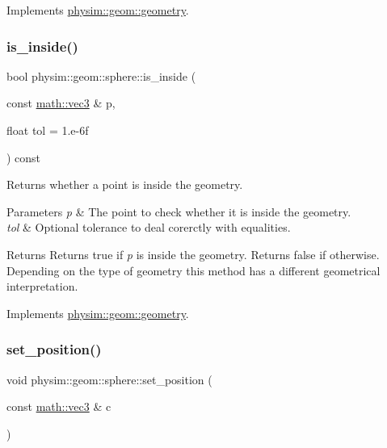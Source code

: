 Implements \hyperlink{classphysim_1_1geom_1_1geometry_a0870a4892819489b7e830663a3f582b8}{physim\+::geom\+::geometry}.

\mbox{\label{classphysim_1_1geom_1_1sphere_a418c319892851c7a29e1a37e07a6811e}} 
\subsubsection{\texorpdfstring{is\+\_\+inside()}{is\_inside()}}
{\footnotesize\ttfamily bool physim\+::geom\+::sphere\+::is\+\_\+inside (\begin{DoxyParamCaption}\item[{const \hyperlink{structphysim_1_1math_1_1vec3}{math\+::vec3} \&}]{p,  }\item[{float}]{tol = {\ttfamily 1.e-\/6f} }\end{DoxyParamCaption}) const\hspace{0.3cm}{\ttfamily [virtual]}}



Returns whether a point is inside the geometry. 


\begin{DoxyParams}{Parameters}
{\em p} & The point to check whether it is inside the geometry. \\
\hline
{\em tol} & Optional tolerance to deal corerctly with equalities. \\
\hline
\end{DoxyParams}
\begin{DoxyReturn}{Returns}
Returns true if {\itshape p} is inside the geometry. Returns false if otherwise. Depending on the type of geometry this method has a different geometrical interpretation. 
\end{DoxyReturn}


Implements \hyperlink{classphysim_1_1geom_1_1geometry_ab7aa1a32927e96ed384a93b84fbd62b7}{physim\+::geom\+::geometry}.

\mbox{\label{classphysim_1_1geom_1_1sphere_abaedaa499d3fe63f31935e6cd9304446}} 
\subsubsection{\texorpdfstring{set\+\_\+position()}{set\_position()}}
{\footnotesize\ttfamily void physim\+::geom\+::sphere\+::set\+\_\+position (\begin{DoxyParamCaption}\item[{const \hyperlink{structphysim_1_1math_1_1vec3}{math\+::vec3} \&}]{c }\end{DoxyParamCaption})\hspace{0.3cm}{\ttfamily [virtual]}}



